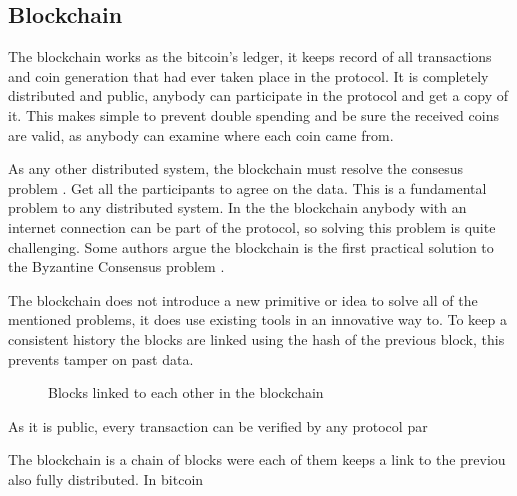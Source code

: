 \subsection{Blockchain}
  The blockchain works as the bitcoin's ledger, it keeps record of all
transactions and coin generation that had ever taken place in the protocol.
It is completely distributed and public, anybody can participate in the
protocol and get a copy of it. This makes simple to prevent double spending
and be sure the received coins are valid, as anybody can examine where each
coin came from.

As any other distributed system, the blockchain must resolve the consesus
  problem \cite{fischer1983consensus}. Get all the participants to agree on
  the data. This is a fundamental problem to any distributed system. In the
  the blockchain anybody with an internet connection can be part of the
  protocol, so solving this problem is quite challenging. Some authors argue
  the blockchain is the first practical solution to the Byzantine Consensus
  problem \cite{miller2014anonymous} \cite{sun2014solving}.

The blockchain does not introduce a new primitive or idea to solve all of the
  mentioned problems, it does use existing tools in an innovative way to.
To keep a consistent history the blocks are linked using the hash of the
  previous block, this prevents tamper on past data.
\begin{figure}
	\centering
	\def\svgwidth{\columnwidth}
	
	\caption{Blocks linked to each other in the blockchain}
	\label{fig:block_links}
\end{figure}



As it is public, every transaction can be verified by any protocol par

  The blockchain is  a chain of blocks were each of them keeps a link
to the previou
  also fully distributed. In bitcoin


